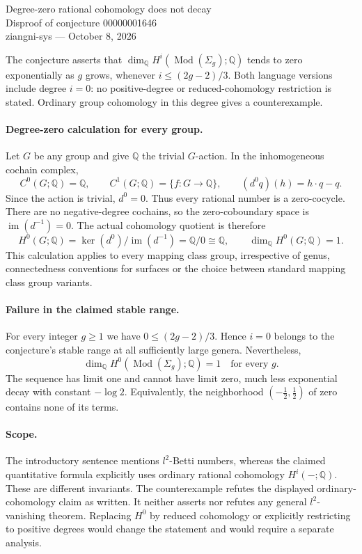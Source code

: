\documentclass[11pt]{article}
\begin{document}
\begin{center}{\Large Degree-zero rational cohomology does not decay}\\[4pt]
Disproof of conjecture 00000001646\\[4pt]
ziangni-sys --- October 8, 2026\end{center}

The conjecture asserts that
$\dim_{\mathbb Q}H^i(\operatorname{Mod}(\Sigma_g);\mathbb Q)$ tends to zero
exponentially as $g$ grows, whenever $i\le (2g-2)/3$. Both language versions
include degree $i=0$: no positive-degree or reduced-cohomology restriction
is stated. Ordinary group cohomology in this degree gives a counterexample.

\paragraph{Degree-zero calculation for every group.}
Let $G$ be any group and give $\mathbb Q$ the trivial $G$-action. In the
inhomogeneous cochain complex,
\[
 C^0(G;\mathbb Q)=\mathbb Q,\qquad
 C^1(G;\mathbb Q)=\{f:G\to\mathbb Q\},\qquad
 (d^0q)(h)=h\cdot q-q.
\]
Since the action is trivial, $d^0=0$. Thus every rational number is a
zero-cocycle. There are no negative-degree cochains, so the zero-coboundary
space is $\operatorname{im}(d^{-1})=0$. The actual cohomology quotient is
therefore
\[
 H^0(G;\mathbb Q)=\ker(d^0)/\operatorname{im}(d^{-1})
 =\mathbb Q/0\cong\mathbb Q,
 \qquad \dim_{\mathbb Q}H^0(G;\mathbb Q)=1.
\]
This calculation applies to every mapping class group, irrespective of genus,
connectedness conventions for surfaces or the choice between standard
mapping class group variants.

\paragraph{Failure in the claimed stable range.}
For every integer $g\ge1$ we have $0\le(2g-2)/3$. Hence $i=0$ belongs to the
conjecture's stable range at all sufficiently large genera. Nevertheless,
\[
 \dim_{\mathbb Q}H^0(\operatorname{Mod}(\Sigma_g);\mathbb Q)=1
 \quad\text{for every }g.
\]
The sequence has limit one and cannot have limit zero, much less exponential
decay with constant $-\log2$. Equivalently, the neighborhood
$(-\tfrac12,\tfrac12)$ of zero contains none of its terms.

\paragraph{Scope.}
The introductory sentence mentions $l^2$-Betti numbers, whereas the claimed
quantitative formula explicitly uses ordinary rational cohomology
$H^i(-;\mathbb Q)$. These are different invariants. The counterexample
refutes the displayed ordinary-cohomology claim as written. It neither
asserts nor refutes any general $l^2$-vanishing theorem. Replacing $H^0$
by reduced cohomology or explicitly restricting to positive degrees would
change the statement and would require a separate analysis.
\end{document}
